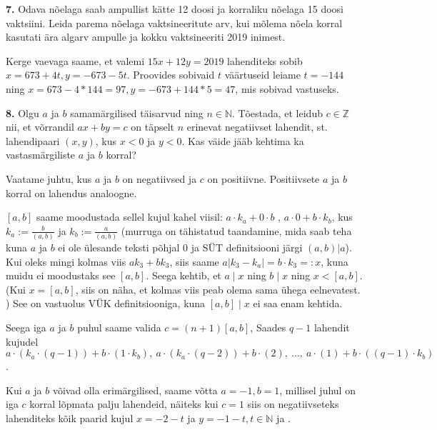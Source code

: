 \documentclass[a4paper, 10pt]{article}
\newcommand{\Z}{\mathbb{Z}}
\newcommand{\N}{\mathbb{N}}
\begin{document}
\noindent \textbf{7.} Odava nõelaga saab ampullist kätte 12 doosi ja korraliku nõelaga 15 doosi vaktsiini. Leida parema nõelaga vaktsineeritute arv, kui mõlema nõela korral kasutati ära algarv ampulle ja kokku vaktsineeriti 2019 inimest.

\bigskip
Kerge vaevaga saame, et valemi $15x+12y=2019$ lahenditeks sobib $x=673+4t, y=-673-5t$. Proovides sobivaid $t$ väärtuseid leiame $t=-144$ ning $x=673-4*144=97,y=-673+144*5=47$, mis sobivad vastuseks.
\bigskip

\noindent \textbf{8.} Olgu $a$ ja $b$ samamärgilised täisarvud ning $n\in\N$. Tõestada, et leidub $c\in\Z$ nii, et võrrandil $ax+by=c$ on täpselt $n$ erinevat negatiivset lahendit, st. lahendipaari $(x,y)$, kus $x<0$ ja $y<0$. Kas väide jääb kehtima ka vastasmärgiliste $a$ ja $b$ korral?


\bigskip

Vaatame juhtu, kus $a$ ja $b$ on negatiivsed ja $c$ on positiivne. Positiivsete $a$ ja $b$ korral on lahendus analoogne.

$[a,b]$ saame moodustada sellel kujul kahel viisil: $a\cdot k_a+0\cdot b$ , $a\cdot 0+b\cdot k_b$, kus $k_a:=\frac{b}{(a,b)}$ ja $k_b:=\frac{a}{(a,b)}$ (murruga on tähistatud taandamine, mida saab teha kuna $a$ ja $b$ ei ole ülesande teksti põhjal 0 ja SÜT definitsiooni järgi $(a,b)|a$). Kui oleks mingi kolmas viis $ak_3+bk_3$, siis saame $a|k_3-k_a|=b\cdot k_3=:x$, kuna muidu ei moodustaks see $[a,b]$. Seega kehtib, et $a\mid x$ ning  $b\mid x$ ning $x<[a,b]$. (Kui $x=[a,b]$, siis on näha, et kolmas viis peab olema sama ühega eelnevatest. ) See on vastuolus VÜK definitsiooniga, kuna $[a,b]\mid x$ ei saa enam kehtida. 


Seega iga $a$ ja $b$ puhul saame valida $c=(n+1)[a,b]$, Saades $q-1$ lahendit kujudel $a\cdot(k_a\cdot (q-1))+b\cdot (1\cdot k_b),\ a\cdot(k_a\cdot (q-2))+b\cdot (2),\ \dots,\ a\cdot(1)+b\cdot ((q-1)\cdot k_b)$.

Kui $a$ ja $b$ võivad olla erimärgilised, saame võtta $a=-1,b=1$, millisel juhul on iga $c$ korral lõpmata palju lahendeid, näiteks kui $c=1$ siis on negatiivseteks lahenditeks kõik paarid kujul $x=-2-t$ ja $y=-1-t, t\in\mathbb{N}$ ja .
\end{document}

